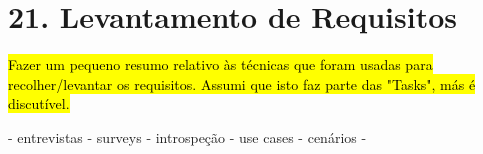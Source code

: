 \chapter*{21. Levantamento de Requisitos}

\hl{Fazer um pequeno resumo relativo às técnicas que foram usadas para recolher/levantar os requisitos. Assumi que isto faz parte das "Tasks", más é discutível.}


- entrevistas 
- surveys
- introspeção 
- use cases
- cenários
- 